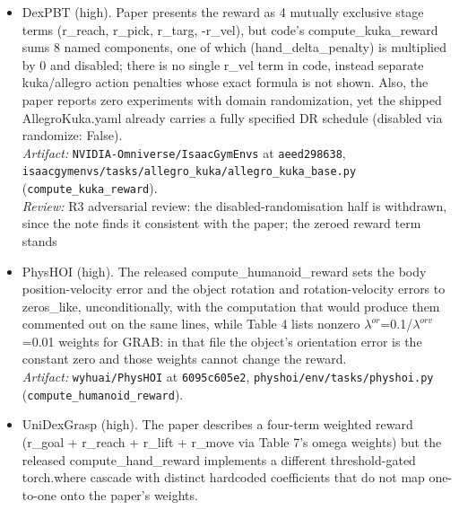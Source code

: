 \begin{itemize}
  \\ \emph{Artifact:} \texttt{Improbable-AI/\allowbreak{}dexenv} at \texttt{ad9634e9d2}, \texttt{dexenv/\allowbreak{}conf/\allowbreak{}dclaw.yaml} (\texttt{alg.num\_\allowbreak{}envs}).
\item DexPBT \cite{dexpbt_2023} (high). Paper presents the reward as 4 mutually exclusive stage terms (r\_\allowbreak{}reach, r\_\allowbreak{}pick, r\_\allowbreak{}targ, -r\_\allowbreak{}vel), but code's compute\_\allowbreak{}kuka\_\allowbreak{}reward sums 8 named components, one of which (hand\_\allowbreak{}delta\_\allowbreak{}penalty) is multiplied by 0 and disabled; there is no single r\_\allowbreak{}vel term in code, instead separate kuka/allegro action penalties whose exact formula is not shown. Also, the paper reports zero experiments with domain randomization, yet the shipped AllegroKuka.yaml already carries a fully specified DR schedule (disabled via randomize: False).
  \\ \emph{Artifact:} \texttt{NVIDIA-Omniverse/\allowbreak{}IsaacGymEnvs} at \texttt{aeed298638}, \texttt{isaacgymenvs/\allowbreak{}tasks/\allowbreak{}allegro\_\allowbreak{}kuka/\allowbreak{}allegro\_\allowbreak{}kuka\_\allowbreak{}base.py} (\texttt{compute\_\allowbreak{}kuka\_\allowbreak{}reward}).
  \\ \emph{Review:} R3 adversarial review: the disabled-randomisation half is withdrawn, since the note finds it consistent with the paper; the zeroed reward term stands
\item PhysHOI \cite{physhoi_2023} (high). The released compute\_\allowbreak{}humanoid\_\allowbreak{}reward sets the body position-velocity error and the object rotation and rotation-velocity errors to zeros\_\allowbreak{}like, unconditionally, with the computation that would produce them commented out on the same lines, while Table 4 lists nonzero $\lambda^{or}$=0.1/$\lambda^{orv}$=0.01 weights for GRAB: in that file the object's orientation error is the constant zero and those weights cannot change the reward.
  \\ \emph{Artifact:} \texttt{wyhuai/\allowbreak{}PhysHOI} at \texttt{6095c605e2}, \texttt{physhoi/\allowbreak{}env/\allowbreak{}tasks/\allowbreak{}physhoi.py} (\texttt{compute\_\allowbreak{}humanoid\_\allowbreak{}reward}).
\item UniDexGrasp \cite{unidexgrasp_2023} (high). The paper describes a four-term weighted reward (r\_\allowbreak{}goal + r\_\allowbreak{}reach + r\_\allowbreak{}lift + r\_\allowbreak{}move via Table 7's omega weights) but the released compute\_\allowbreak{}hand\_\allowbreak{}reward implements a different threshold-gated torch.where cascade with distinct hardcoded coefficients that do not map one-to-one onto the paper's weights.

\end{itemize}
